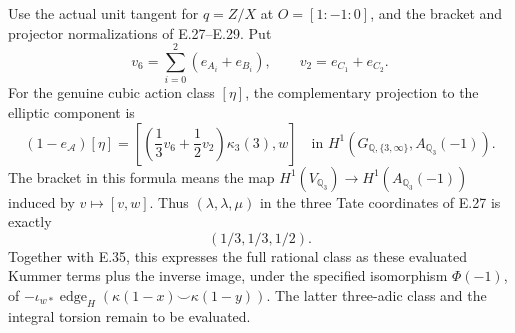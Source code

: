 \begin{proposition}
\label{E-kummer-values}
Use the actual unit tangent for $q=Z/X$ at
$O=[1:-1:0]$, and the bracket and projector
normalizations of E.27--E.29. Put
\[
 v_6=\sum_{i=0}^2(e_{A_i}+e_{B_i}),
 \qquad v_2=e_{C_1}+e_{C_2}.
\]
For the genuine cubic action class $[\eta]$,
the complementary projection to the elliptic
component is
\[
 (1-e_{\mathcal A})[\eta]
   =\left[\left(
          \frac13v_6+\frac12v_2\right)\kappa_3(3),w\right]
 \quad\text{in }H^1(G_{\mathbb Q,\{3,\infty\}},
                         A_{\mathbb Q_3}(-1)).
 \tag{E.36.1}
\]
The bracket in this formula means the map
$H^1(V_{\mathbb Q_3})\to H^1(A_{\mathbb Q_3}(-1))$
induced by $v\mapsto[v,w]$.
Thus $(\lambda,\lambda,\mu)$ in the three
Tate coordinates of E.27 is exactly
\[
                  (1/3,1/3,1/2).
 \tag{E.36.2}
\]
Together with E.35, this expresses the full
rational class as these evaluated Kummer
terms plus the inverse image, under the
specified isomorphism $\Phi(-1)$, of
$-\iota_{w*}\operatorname{edge}_H
(\kappa(1-x)\smile\kappa(1-y))$.
The latter three-adic class and the integral
torsion remain to be evaluated.
\end{proposition}
